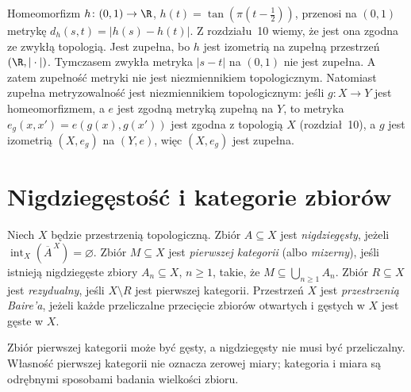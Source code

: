 \begin{przyklad}
\label{ex:topog-baire-metryka-przedzial}
Homeomorfizm $h\colon(0,1)\to\R$,
$h(t)=\tan(\pi(t-\tfrac12))$, przenosi na $(0,1)$
metrykę $d_h(s,t)=|h(s)-h(t)|$. Z rozdziału~10
wiemy, że jest ona zgodna ze zwykłą topologią.
Jest zupełna, bo $h$ jest izometrią na zupełną
przestrzeń $(\R,|\cdot|)$. Tymczasem zwykła
metryka $|s-t|$ na $(0,1)$ nie jest zupełna.
A zatem zupełność metryki nie jest niezmiennikiem
topologicznym. Natomiast zupełna metryzowalność
jest niezmiennikiem topologicznym: jeśli
$g\colon X\to Y$ jest homeomorfizmem, a $e$ jest
zgodną metryką zupełną na $Y$, to metryka
$e_g(x,x')=e(g(x),g(x'))$ jest zgodna z topologią
$X$ (rozdział~10), a $g$ jest izometrią
$(X,e_g)$ na $(Y,e)$, więc $(X,e_g)$ jest zupełna.
\end{przyklad}

\section{Nigdziegęstość i kategorie zbiorów}
\label{sec:topog-baire-kategorie}

\begin{definicja}
\label{def:topog-baire-kategoria}
Niech $X$ będzie przestrzenią topologiczną.
Zbiór $A\subseteq X$ jest \emph{nigdziegęsty},
jeżeli $\operatorname{int}_X(\overline A^{\,X})
=\varnothing$. Zbiór $M\subseteq X$ jest
\emph{pierwszej kategorii} (albo \emph{mizerny}),
jeśli istnieją nigdziegęste zbiory $A_n\subseteq X$,
$n\ge1$, takie, że $M\subseteq\bigcup_{n\ge1}A_n$.
Zbiór $R\subseteq X$ jest \emph{rezydualny},
jeśli $X\setminus R$ jest pierwszej kategorii.
Przestrzeń $X$ jest \emph{przestrzenią Baire'a},
jeżeli każde przeliczalne przecięcie
zbiorów otwartych i gęstych w $X$ jest gęste w $X$.
\end{definicja}

\begin{uwaga}
Zbiór pierwszej kategorii może być gęsty,
a nigdziegęsty nie musi być przeliczalny.
Własność pierwszej kategorii nie oznacza
zerowej miary; kategoria i miara są
odrębnymi sposobami badania wielkości zbioru.
\end{uwaga}

